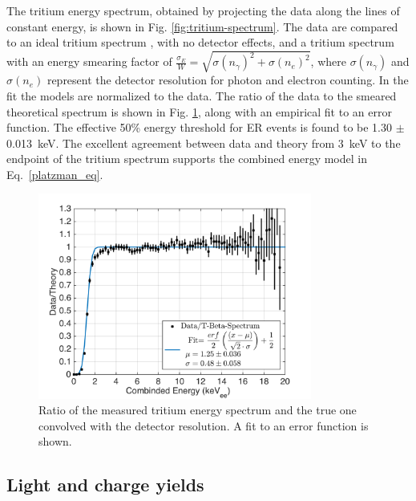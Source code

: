 The tritium energy spectrum, obtained by projecting the data along the lines of constant energy, is shown in Fig. \ref{fig:tritium-spectrum}. The data are compared to an ideal tritium spectrum \cite{Tritium_Eq_Simpson}, with no detector effects, and a tritium spectrum with an energy smearing factor of $ \frac{\sigma_E}{W} = \sqrt{\sigma(n_{\gamma})^2 + \sigma(n_e)^2}$, where $ \sigma(n_{\gamma})$ and $ \sigma(n_e)$ represent the detector resolution for photon and electron counting. In the fit the models are normalized to the data. The ratio of the data to the smeared theoretical spectrum is shown in Fig. \ref{fig:ER-threshold}, along with an empirical fit to an error function. The effective 50\% energy threshold for ER events is found to be 1.30 $\pm$ 0.013~keV. The excellent agreement between data and theory from 3~keV to the endpoint of the tritium spectrum supports the combined energy model in Eq.~\ref{platzman_eq}.

\begin{figure}[h!]
\includegraphics[width=90mm]{fig/E_Thres_Fit.png}
\caption{Ratio of the measured tritium energy spectrum and the true one convolved with the detector resolution. A fit to an error function is shown.}
\label{fig:ER-threshold}
\end{figure}

\subsection{Light and charge yields}

